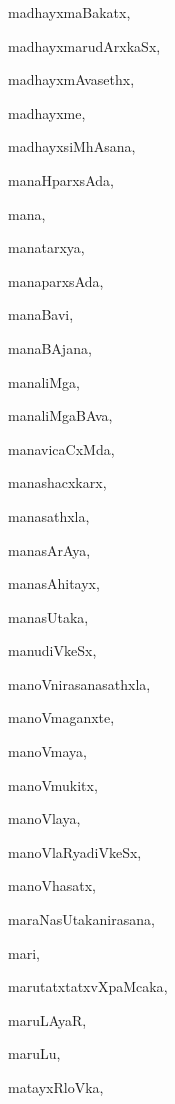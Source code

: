 \begin{multicols}{2}
{madhayxmaBakatx}, \pageref{madhayxmaBakatx}

{madhayxmarudArxkaSx}, \pageref{madhayxmarudArxkaSx}

{madhayxmAvasethx}, \pageref{madhayxmAvasethx}

{madhayxme}, \pageref{madhayxme}

{madhayxsiMhAsana}, \pageref{madhayxsiMhAsana}

{manaHparxsAda}, \pageref{manaHparxsAda}

{mana}, \pageref{mana}

{manatarxya}, \pageref{manatarxya}

{manaparxsAda}, \pageref{manaparxsAda}

{manaBavi}, \pageref{manaBavi}

{manaBAjana}, \pageref{manaBAjana}

{manaliMga}, \pageref{manaliMga}

{manaliMgaBAva}, \pageref{manaliMgaBAva}

{manavicaCxMda}, \pageref{manavicaCxMda}

{manashacxkarx}, \pageref{manashacxkarx}

{manasathxla}, \pageref{manasathxla}

{manasArAya}, \pageref{manasArAya}

{manasAhitayx}, \pageref{manasAhitayx}

{manasUtaka}, \pageref{manasUtaka}

{manudiVkeSx}, \pageref{manudiVkeSx}

{manoVnirasanasathxla}, \pageref{manoVnirasanasathxla}

{manoVmaganxte}, \pageref{manoVmaganxte}

{manoVmaya}, \pageref{manoVmaya}

{manoVmukitx}, \pageref{manoVmukitx}

{manoVlaya}, \pageref{manoVlaya}

{manoVlaRyadiVkeSx}, \pageref{manoVlaRyadiVkeSx}

{manoVhasatx}, \pageref{manoVhasatx}

{maraNasUtakanirasana}, \pageref{maraNasUtakanirasana}

{mari}, \pageref{mari}

{marutatxtatxvXpaMcaka}, \pageref{marutatxtatxvXpaMcaka}

{maruLAyaR}, \pageref{maruLAyaR}

{maruLu}, \pageref{maruLu}

{matayxRloVka}, \pageref{matayxRloVka}


\end{multicols}
